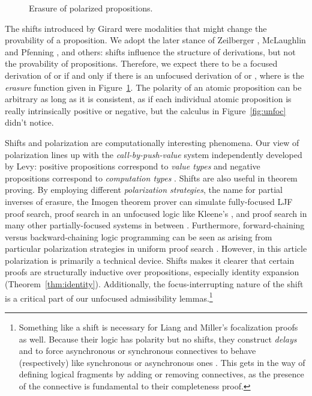 \documentclass[acmtocl]{robtrans}\pdfoutput=1
\begin{document}
\begin{figure}

\caption{Erasure of polarized propositions.}
\label{fig:erasure}
\end{figure}

The shifts introduced by Girard were modalities that might change the
provability of a proposition. We adopt the later stance of Zeilberger
, McLaughlin and Pfenning
, and others: shifts influence the
structure of derivations, but not the provability of
propositions. Therefore, we expect there to be a focused derivation of
 or  if and only if there is an unfocused derivation of
 or , where  is the {\it
  erasure} function given in Figure~\ref{fig:erasure}.  The polarity
of an atomic proposition can be arbitrary as long as it is consistent,
as if each individual atomic proposition  is really intrinsically
positive or negative, but the calculus in Figure~\ref{fig:unfoc}
didn't notice.


Shifts and polarization are computationally interesting phenomena. Our
view of polarization lines up with the {\it call-by-push-value} system
independently developed by Levy: positive propositions correspond to
{\it value types} and negative propositions correspond to {\it
  computation types} \cite{levy04call}.  Shifts are also useful in
theorem proving. By employing different {\it polarization strategies},
the name for partial inverses of erasure, the Imogen theorem prover can
simulate fully-focused LJF proof search, proof search in an unfocused
logic like Kleene's , and proof search in many other
partially-focused systems in between \cite{mclaughlin09efficient}.
Furthermore, forward-chaining versus backward-chaining logic
programming can be seen as arising from particular polarization
strategies in uniform proof search \cite{chaudhuri10logical}. However,
in this article polarization is primarily a technical device. Shifts
makes it clearer that certain proofs are structurally inductive over
propositions, especially identity expansion
(Theorem~\ref{thm:identity}).  Additionally, the focus-interrupting
nature of the shift is a critical part of our unfocused admissibility
lemmas.\footnote{Something like a shift is necessary for Liang and
  Miller's focalization proofs as well. Because their logic has
  polarity but no shifts, they construct {\it delays}  and  to force
  asynchronous or synchronous connectives to behave (respectively)
  like synchronous or asynchronous ones \cite{liang09focusing}. This
  gets in the way of defining logical fragments by adding or removing
  connectives, as the presence of the connective  is
  fundamental to their completeness proof.}
\end{document}

